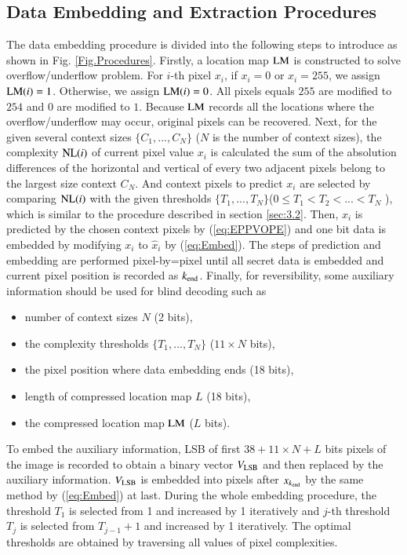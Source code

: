 \documentclass[review,3p,10pt,sort&compress]{elsarticle}
\begin{document}
\subsection{Data Embedding and Extraction Procedures}\label{sec:3.3}
The data embedding procedure is divided into the following steps to introduce as shown in Fig. \ref{Fig.Procedures}. Firstly, a location map ${\rm LM}$ is constructed to solve overflow/underflow problem. For $i$-th pixel $x_i$, if $x_i = 0$ or $x_i = 255$, we assign ${\rm LM}(i) = 1$. Otherwise, we assign ${\rm LM}(i) = 0$. All pixels equals $255$ are modified to $254$ and $0$ are modified to $1$. Because ${\rm LM}$ records all the locations where the overflow/underflow may occur, original pixels can be recovered. Next, for the given several context sizes $\{C_1, ..., C_N\}$ ($N$ is the number of context sizes), the complexity ${\rm NL}(i)$ of current pixel value $x_i$ is calculated the sum of the absolution differences of the horizontal and vertical of every two adjacent pixels belong to the largest size context $C_N$. And context pixels to predict $x_i$ are selected by comparing ${\rm NL}(i)$ with the given thresholds $\{T_1, ..., T_N\}$($0 \leq T_1 < T_2 < ... < T_N$ ), which is similar to the procedure described in section \ref{sec:3.2}. Then, $x_i$ is predicted by the chosen context pixels by (\ref{eq:EPPVOPE}) and one bit data is embedded by modifying $x_i$ to $\hat{x}_i$ by (\ref{eq:Embed}). The steps of prediction and embedding are performed pixel-by=pixel until all secret data is embedded and current pixel position is recorded as $k_{\rm end}$. Finally, for reversibility, some auxiliary information should be used for blind decoding such as
\begin{itemize}
  \item number of context sizes $N$ (2 bits),
  \item the complexity thresholds $\{T_1, ..., T_N\}$ ($11 \times N$ bits),
  \item the pixel position where data embedding ends (18 bits),
  \item length of compressed location map $L$ (18 bits),
  \item the compressed location map ${\rm LM}$ ($L$ bits).
\end{itemize}
To embed the auxiliary information, LSB of first $38 + 11 \times N + L$ bits pixels of the image is recorded to obtain a binary vector $V_{\rm LSB}$ and then replaced by the auxiliary information. $V_{\rm LSB}$ is embedded into pixels after $x_{k_{\rm end}}$ by the same method by (\ref{eq:Embed}) at last.
During the whole embedding procedure, the threshold $T_1$ is selected from 1 and increased by 1 iteratively and $j$-th threshold $T_j$ is selected from $T_{j-1} + 1$ and increased by 1 iteratively. The optimal thresholds are obtained by traversing all values of pixel complexities.
\end{document}
